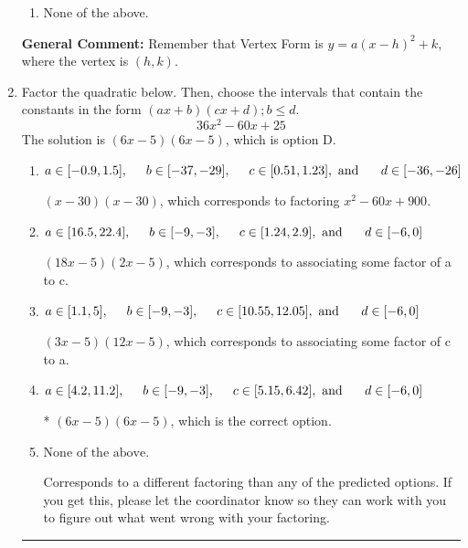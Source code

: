 \documentclass{extbook}[14pt]
\newcommand{\litem}[1]{\item #1

\rule{\textwidth}{0.4pt}}
\begin{document}
\begin{enumerate}
{\begin{enumerate}[label=\Alph*.]
\begin{multicols}{2}
\end{multicols}\item None of the above.\end{enumerate}
\textbf{General Comment:} Remember that Vertex Form is $y = a(x-h)^2+k$, where the vertex is $(h, k)$.
}
\litem{
Factor the quadratic below. Then, choose the intervals that contain the constants in the form $(ax+b)(cx+d); b \leq d.$
\[ 36x^{2} -60 x + 25 \]The solution is \( (6x -5)(6x -5) \), which is option D.\begin{enumerate}[label=\Alph*.]
\item \( a \in [-0.9, 1.5], \hspace*{5mm} b \in [-37, -29], \hspace*{5mm} c \in [0.51, 1.23], \text{ and } \hspace*{5mm} d \in [-36, -26] \)

 $(x -30)(x -30)$, which corresponds to factoring $x^{2} -60 x + 900$.
\item \( a \in [16.5, 22.4], \hspace*{5mm} b \in [-9, -3], \hspace*{5mm} c \in [1.24, 2.9], \text{ and } \hspace*{5mm} d \in [-6, 0] \)

 $(18x -5)(2x -5)$, which corresponds to associating some factor of a to c.
\item \( a \in [1.1, 5], \hspace*{5mm} b \in [-9, -3], \hspace*{5mm} c \in [10.55, 12.05], \text{ and } \hspace*{5mm} d \in [-6, 0] \)

 $(3x -5)(12x -5)$, which corresponds to associating some factor of c to a.
\item \( a \in [4.2, 11.2], \hspace*{5mm} b \in [-9, -3], \hspace*{5mm} c \in [5.15, 6.42], \text{ and } \hspace*{5mm} d \in [-6, 0] \)

* $(6x -5)(6x -5)$, which is the correct option.
\item \( \text{None of the above.} \)

 Corresponds to a different factoring than any of the predicted options. If you get this, please let the coordinator know so they can work with you to figure out what went wrong with your factoring.
\end{enumerate}

}
\end{enumerate}
\end{document}
